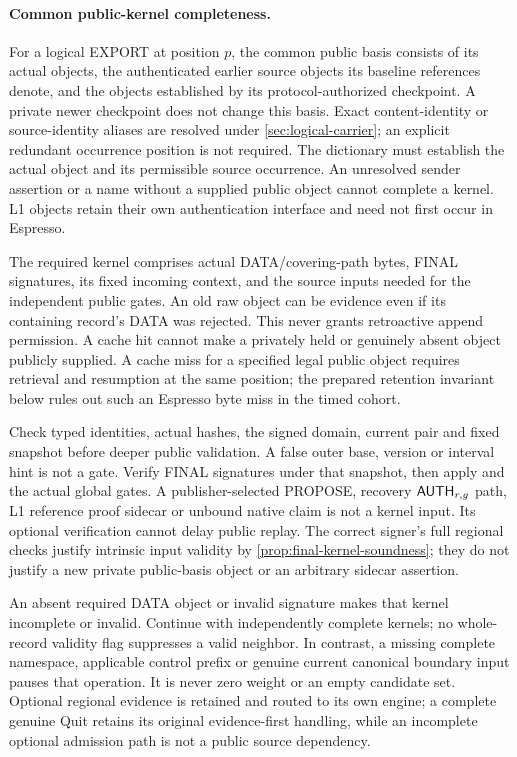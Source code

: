 \paragraph{Common public-kernel completeness.}
\label{sec:record-completeness}
For a logical EXPORT at position $p$, the common public basis consists
of its actual objects, the authenticated earlier source objects its
baseline references denote, and the objects established by its
protocol-authorized checkpoint. A private newer checkpoint does not
change this basis. Exact content-identity or source-identity aliases
are resolved under \cref{sec:logical-carrier}; an explicit redundant
occurrence position is not required. The dictionary must establish the
actual object and its permissible source occurrence. An unresolved
sender assertion or a name without a supplied public object cannot
complete a kernel. L1 objects retain their own authentication interface
and need not first occur in Espresso.

The required kernel comprises actual DATA/covering-path bytes, FINAL
signatures, its fixed incoming context, and the source inputs needed
for the independent public gates. An old raw object can be evidence
even if its containing record's DATA was rejected. This never grants
retroactive append permission. A cache hit cannot make a privately
held or genuinely absent object publicly supplied. A cache miss for a
specified legal public object requires retrieval and resumption at the
same position; the prepared retention invariant below rules out such
an Espresso byte miss in the timed cohort.

Check typed identities, actual hashes, the signed domain, current pair
and fixed snapshot before deeper public validation. A false outer base,
version or interval hint is not a gate. Verify FINAL signatures under
that snapshot, then apply  and the actual global gates.
A publisher-selected PROPOSE, recovery $\mathsf{AUTH}_{r,g}$ path, L1
reference proof sidecar or unbound native claim is not a kernel input.
Its optional verification cannot delay public replay. The correct
signer's full regional checks justify intrinsic input validity by
\cref{prop:final-kernel-soundness}; they do not justify a new private
public-basis object or an arbitrary sidecar assertion.

An absent required DATA object or invalid signature makes that kernel
incomplete or invalid. Continue with independently complete kernels;
no whole-record validity flag suppresses a valid neighbor. In contrast,
a missing complete namespace, applicable control prefix or genuine
current canonical boundary input pauses that operation. It is never
zero weight or an empty candidate set. Optional regional evidence is
retained and routed to its own engine; a complete genuine Quit retains
its original evidence-first handling, while an incomplete optional
admission path is not a public source dependency.


